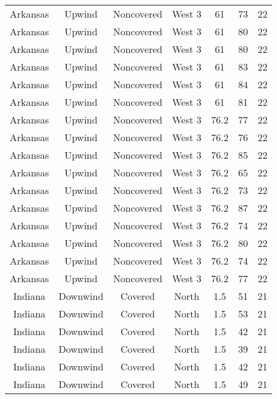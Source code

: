 \documentclass{article}
\begin{document}
\begin{longtable}[H]{ccccccc}
Arkansas & Upwind    & Noncovered & West 3        & 61           & 73          & 22  \\
Arkansas & Upwind    & Noncovered & West 3        & 61           & 80          & 22  \\
Arkansas & Upwind    & Noncovered & West 3        & 61           & 80          & 22  \\
Arkansas & Upwind    & Noncovered & West 3        & 61           & 83          & 22  \\
Arkansas & Upwind    & Noncovered & West 3        & 61           & 84          & 22  \\
Arkansas & Upwind    & Noncovered & West 3        & 61           & 81          & 22  \\
Arkansas & Upwind    & Noncovered & West 3        & 76.2         & 77          & 22  \\
Arkansas & Upwind    & Noncovered & West 3        & 76.2         & 76          & 22  \\
Arkansas & Upwind    & Noncovered & West 3        & 76.2         & 85          & 22  \\
Arkansas & Upwind    & Noncovered & West 3        & 76.2         & 65          & 22  \\
Arkansas & Upwind    & Noncovered & West 3        & 76.2         & 73          & 22  \\
Arkansas & Upwind    & Noncovered & West 3        & 76.2         & 87          & 22  \\
Arkansas & Upwind    & Noncovered & West 3        & 76.2         & 74          & 22  \\
Arkansas & Upwind    & Noncovered & West 3        & 76.2         & 80          & 22  \\
Arkansas & Upwind    & Noncovered & West 3        & 76.2         & 74          & 22  \\
Arkansas & Upwind    & Noncovered & West 3        & 76.2         & 77          & 22  \\
Indiana & Downwind & Covered     & North  & 1.5  & 51 & 21 \\
Indiana & Downwind & Covered     & North  & 1.5  & 53 & 21 \\
Indiana & Downwind & Covered     & North  & 1.5  & 42 & 21 \\
Indiana & Downwind & Covered     & North  & 1.5  & 39 & 21 \\
Indiana & Downwind & Covered     & North  & 1.5  & 42 & 21 \\
Indiana & Downwind & Covered     & North  & 1.5  & 49 & 21 \\

\end{longtable}
\end{document}
